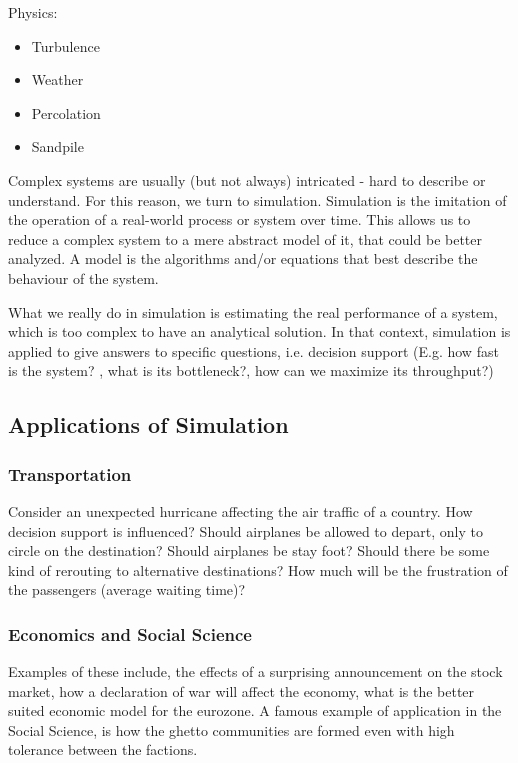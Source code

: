 \documentclass[a4paper]{article}
\begin{document}
Physics:

\begin{itemize}
\item    Turbulence
\item    Weather
\item    Percolation
\item    Sandpile
\end{itemize}


Complex systems are usually (but not always) intricated - hard to describe or understand\cite{burian_complex_????}. For this reason, we turn to simulation. 
Simulation is the imitation of the operation of a real-world process or system over time.
This allows us to reduce a complex system to a mere abstract model of it, that could be better
analyzed. A model is the algorithms and/or equations that best describe the behaviour of the system.

What we really do in simulation is estimating the real performance of a system, 
which is too complex to have an analytical solution. In that context,
simulation is applied to give answers to specific questions, i.e. decision support (E.g. how fast
is the system? , what is its bottleneck?, how can we maximize its throughput?)

\subsection{Applications of Simulation}

\subsubsection{Transportation}

Consider an unexpected hurricane affecting the air traffic of a country. 
How decision support is influenced? Should airplanes
be allowed to depart, only to circle on the destination?
Should airplanes be stay foot? Should there be some kind of rerouting
to alternative destinations? How much will be the frustration of the passengers (average waiting time)?

\subsubsection{Economics and Social Science}

Examples of these include, the effects of a surprising announcement on the stock market,
how a declaration of war will affect the economy, what is the better suited
economic model for the eurozone. A famous example of application in the Social Science,
is how the ghetto communities are formed even with high tolerance between the factions.
\end{document}
